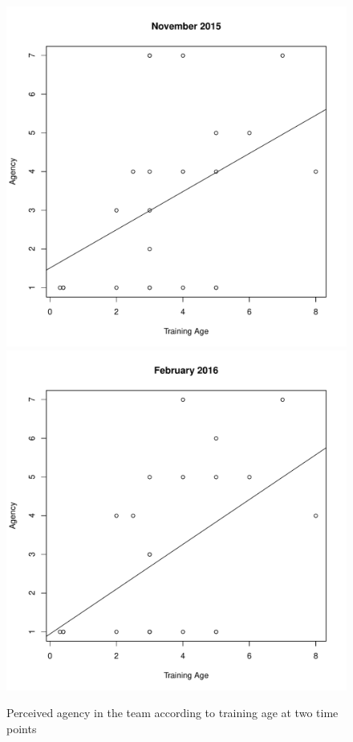 \begin{CJK}{UTF8}{gbsn}
\begin{figure}[htbp]
  \centering
\includegraphics[scale=.3]{images/agencyTrainingNov.pdf}
\includegraphics[scale=.3]{images/agencyTrainingFeb.pdf}
  \caption{Perceived agency in the team according to training age at two time points}
  \label{fig:agencyTrainingAge}
\end{figure}


\end{CJK}
